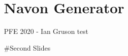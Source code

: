 \hypertarget{navon-generator}{%
\section{Navon Generator}\label{navon-generator}}

\begin{frame}{PFE 2020 - Ian Gruson}
\protect\hypertarget{pfe-2020---ian-gruson}{}
test

\#Second Slides
\end{frame}

